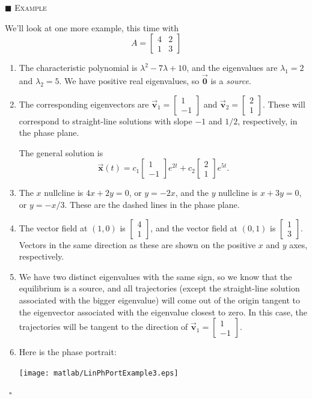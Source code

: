 \documentclass[reqno]{immbook}
\newcommand{\BV}{\vec{\textbf{v}}}
\newcommand{\BX}{\vec{\textbf{x}}}
\newcommand{\BZero}{\vec{\textbf{0}}}  %
\numberwithin{equation}{chapter}
\numberwithin{question}{section}
\numberwithin{theorem}{chapter}
\numberwithin{figure}{chapter}
\theoremstyle{definition}
\newenvironment{xexample}%
{%

\medskip\noindent\addtocounter{example}{1}$\blacksquare$ \textsc{Example \theexample}\hspace*{1em}%
}%
{%
~\hfill$\square$

\medskip
}
\begin{document}
\newpage

\begin{xexample}
We'll look at one more example, this time with
\[
   A = \begin{bmatrix}
            4 & 2 \\ 1 & 3
       \end{bmatrix}
\]
\begin{enumerate}
\item
The characteristic polynomial is
$\lambda^2 -7\lambda +10$, and the eigenvalues are
$\lambda_1 = 2$ and $\lambda_2 = 5$.
We have positive real eigenvalues, so
$\BZero$ is a \emph{source}.
\item
The corresponding eigenvectors are
$\BV_1 = \begin{bmatrix} 1 \\ -1 \end{bmatrix}$
and
$\BV_2 = \begin{bmatrix} 2 \\ 1 \end{bmatrix}$.
These will correspond to straight-line solutions with
slope $-1$ and $1/2$, respectively, in the phase plane.

The general solution is
\begin{equation}
\BX(t) = c_1 \begin{bmatrix} 1 \\ -1 \end{bmatrix} e^{2t}
   + c_2 \begin{bmatrix} 2 \\ 1 \end{bmatrix} e^{5t}.
\end{equation}
\item
The $x$ nullcline is $4x+2y=0$, or $y = -2x$, and the
$y$ nullcline is $x+3y=0$, or $y=-x/3$.  These are the
dashed lines in the phase plane.
\item
The vector field at $(1,0)$ is $\begin{bmatrix} 4 \\ 1 \end{bmatrix}$,
and the vector field at $(0,1)$
is $\begin{bmatrix} 1 \\ 3 \end{bmatrix}$.  Vectors in the
same direction as these are shown on the positive $x$ and $y$ axes,
respectively.
\item We have two distinct eigenvalues with the same sign, so
we know that the equilibrium is a source, and all trajectories
(except the straight-line solution associated with the
bigger eigenvalue) will come out of the origin
tangent to the eigenvector associated with the eigenvalue
closest to zero.  In this case, the trajectories will
be tangent to the direction of
$\BV_1 = \begin{bmatrix}1 \\ -1 \end{bmatrix}$.
\item
Here is the phase portrait:

\noindent
\centerline{\texttt{[image: matlab/LinPhPortExample3.eps]}}
\end{enumerate}
\end{xexample}
%
\newpage
\end{document}
